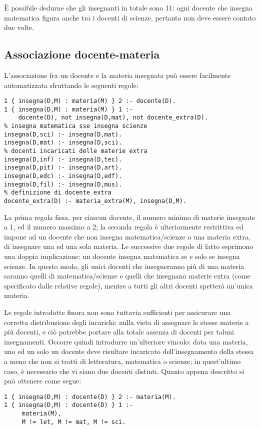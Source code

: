 È possibile dedurne che gli insegnanti in totale sono 11: ogni docente che insegna matematica figura anche tra i docenti di scienze, pertanto non deve essere contato due volte.

\subsection{Associazione docente-materia}
\label{docente_materia}
L'associazione fra un docente e la materia insegnata può essere facilmente automatizzata sfruttando le seguenti regole:
\lstset{language=Octave,basicstyle=\ttfamily}
\begin{lstlisting}[frame=single]
1 { insegna(D,M) : materia(M) } 2 :- docente(D).
1 { insegna(D,M) : materia(M) } 1 :-
	docente(D), not insegna(D,mat), not docente_extra(D).
% insegna matematica sse insegna scienze	
insegna(D,sci) :- insegna(D,mat).
insegna(D,mat) :- insegna(D,sci).
% docenti incaricati delle materie extra
insegna(D,inf) :- insegna(D,tec).
insegna(D,pit) :- insegna(D,art).
insegna(D,edc) :- insegna(D,edf).
insegna(D,fil) :- insegna(D,mus).
% definizione di docente extra
docente_extra(D) :- materia_extra(M), insegna(D,M).
\end{lstlisting}

La prima regola fissa, per ciascun docente, il numero minimo di materie insegnate a 1, ed il numero massimo a 2; la seconda regola è ulteriormente restrittiva ed impone ad un docente che non insegna matematica/scienze o una materia extra, di insegnare una ed una sola materia.
Le successive due regole di fatto esprimono una doppia implicazione: un docente insegna matematica se e solo se insegna scienze. In questo modo, gli unici docenti che insegneranno più di una materia saranno quelli di matematica/scienze e quelli che insegnano materie extra (come specificato dalle relative regole), mentre a tutti gli altri docenti spetterà un'unica materia.
 
 Le regole introdotte finora non sono tuttavia sufficienti per assicurare una corretta distribuzione degli incarichi: nulla vieta di assegnare le stesse materie a più docenti, e ciò potrebbe portare alla totale assenza di docenti per taluni insegnamenti. Occorre quindi introdurre un'ulteriore vincolo: data una materia, uno ed un solo un docente deve risultare incaricato dell'insegnamento della stessa a meno che non si tratti di letteratura, matematica o scienze; in quest'ultimo caso, è necessario che vi siano due docenti distinti.
Quanto appena descritto si può ottenere come segue:
\begin{lstlisting}[frame=single]
1 { insegna(D,M) : docente(D) } 2 :- materia(M).
1 { insegna(D,M) : docente(D) } 1 :-
	 materia(M),
	 M != let, M != mat, M != sci.
\end{lstlisting}

